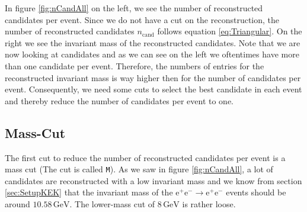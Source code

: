\documentclass[a4paper,11pt,twosided,final,german,openbib,pdftex,listof=totoc,bibliography=totoc]{scrbook}
\begin{document}
In figure \ref{fig:nCandAll} on the left, we see the number of reconstructed candidates per event. Since we do not have a cut on the reconstruction, the number of reconstructed candidates $n_{\textrm{cand}}$ follows equation \ref{eq:Triangular}. On the right we see the invariant mass of the reconstructed candidates. Note that we are now looking at candidates and as we can see on the left we oftentimes have more than one candidate per event. Therefore, the numbers of entries for the reconstructed invariant mass is way higher then for the number of candidates per event.
Consequently, we need some cuts to select the best candidate in each event and thereby reduce the number of candidates per event to one.


\subsection{Mass-Cut}

The first cut to reduce the number of reconstructed candidates per event is a mass cut (The cut is called \texttt{M}). As we saw in figure \ref{fig:nCandAll}, a lot of candidates are reconstructed with a low invariant mass and we know from section \ref{sec:SetupKEK} that the invariant mass of the $\textrm{e}^+\textrm{e}^- \rightarrow \textrm{e}^+\textrm{e}^-$ events should be around $10.58\,\textrm{GeV}$. The lower-mass cut of $8\,\textrm{GeV}$ is rather loose. 
\end{document}
